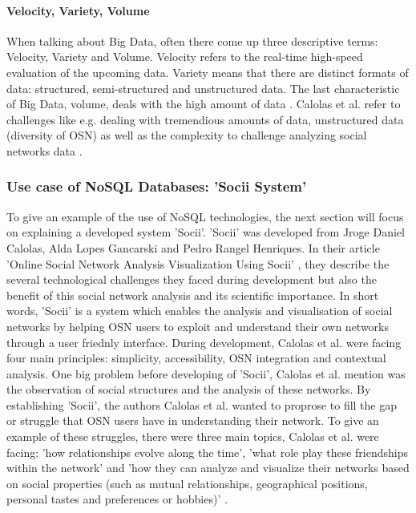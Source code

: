 \paragraph{Velocity, Variety, Volume}

When talking about Big Data, often there come up three descriptive terms: Velocity, Variety and Volume. Velocity refers to the real-time high-speed evaluation of the upcoming data. Variety means that there are distinct formats of data: structured, semi-structured and unstructured data. The last characteristic of Big Data, volume, deals with the high amount of data \cite{nosql_meier}. 
Calolas et al. refer to challenges like e.g. dealing with tremendious amounts of data, unstructured data (diversity of \ac{OSN}) as well as the complexity to challenge analyzing social networks data \cites{trends_nosql}.

\subsubsection{Use case of NoSQL Databases: 'Socii System'}

To give an example of the use of NoSQL technologies, the next section will focus on explaining a developed system 'Socii'. 'Socii' was developed from Jroge Daniel Calolas, Alda Lopes Gancarski and Pedro Rangel Henriques. In their article 'Online Social Network Analysis Visualization Using Socii' \cite[p.218-228]{trends_nosql}, they describe the several technological challenges they faced during development but also the benefit of this social network analysis and its scientific importance. In short words, 'Socii' is a system which enables the analysis and visualisation of social networks by helping \ac{OSN} users to exploit and understand their own networks through a user friednly interface. During development, Calolas et al. were facing four main principles: simplicity, accessibility, OSN integration and contextual analysis.
One big problem before developing of 'Socii', Calolas et al. mention was the observation of social structures and the analysis of these networks. By establishing 'Socii', the authors Calolas et al. wanted to proprose to fill the gap or struggle that OSN users have in understanding their network. To give an example of these struggles, there were three main topics, Calolas et al. were facing: 'how relationships evolve along the time', 'what role play these friendships within the network' and 'how they can analyze and visualize their networks based on social properties (such as mutual relationships, geographical positions, personal tastes and preferences or hobbies)' \cite{trends_nosql}. 


